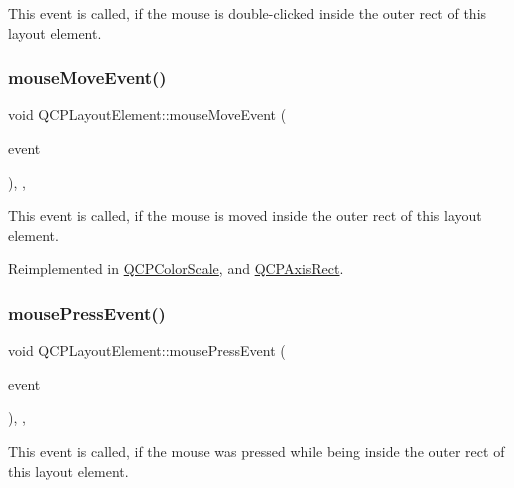 This event is called, if the mouse is double-\/clicked inside the outer rect of this layout element. \hypertarget{class_q_c_p_layout_element_a14f4acf58cdb8dd2c6c571479c4c4a40}{}\label{class_q_c_p_layout_element_a14f4acf58cdb8dd2c6c571479c4c4a40} 
\subsubsection{\texorpdfstring{mouse\+Move\+Event()}{mouseMoveEvent()}}
{\footnotesize\ttfamily void Q\+C\+P\+Layout\+Element\+::mouse\+Move\+Event (\begin{DoxyParamCaption}\item[{Q\+Mouse\+Event $\ast$}]{event }\end{DoxyParamCaption})\hspace{0.3cm}{\ttfamily [inline]}, {\ttfamily [protected]}, {\ttfamily [virtual]}}

This event is called, if the mouse is moved inside the outer rect of this layout element. 

Reimplemented in \hyperlink{class_q_c_p_color_scale_a3aca469d531ce7b5882de73590aa0de6}{Q\+C\+P\+Color\+Scale}, and \hyperlink{class_q_c_p_axis_rect_a4baf3d5dd69166788f6ceda0ea182c6e}{Q\+C\+P\+Axis\+Rect}.

\hypertarget{class_q_c_p_layout_element_a2d82ea21fe0ee628f177bd824bc51a71}{}\label{class_q_c_p_layout_element_a2d82ea21fe0ee628f177bd824bc51a71} 
\subsubsection{\texorpdfstring{mouse\+Press\+Event()}{mousePressEvent()}}
{\footnotesize\ttfamily void Q\+C\+P\+Layout\+Element\+::mouse\+Press\+Event (\begin{DoxyParamCaption}\item[{Q\+Mouse\+Event $\ast$}]{event }\end{DoxyParamCaption})\hspace{0.3cm}{\ttfamily [inline]}, {\ttfamily [protected]}, {\ttfamily [virtual]}}

This event is called, if the mouse was pressed while being inside the outer rect of this layout element. 

